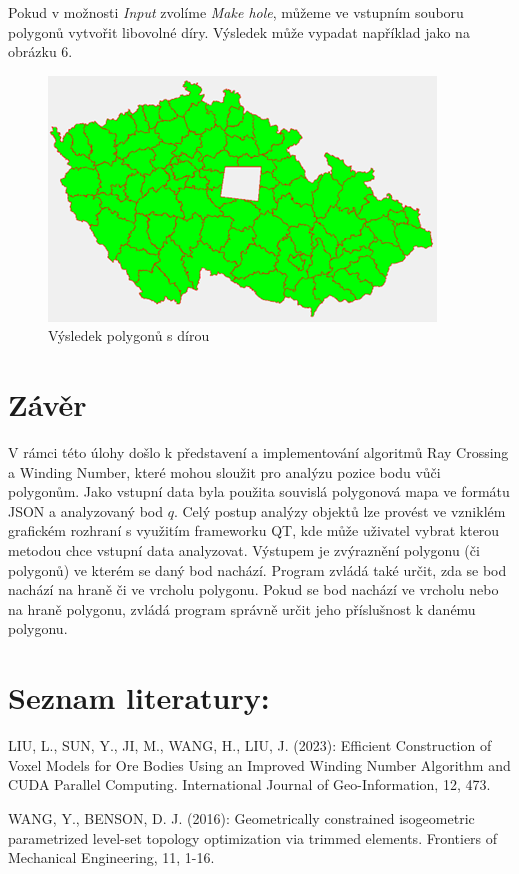 \documentclass{article}
\begin{document}
\begin{spacing}{1.5}
Pokud v možnosti \textit{Input} zvolíme \textit{Make hole}, můžeme ve vstupním souboru polygonů vytvořit libovolné díry. Výsledek může vypadat například jako na obrázku 6.

\begin{figure}[h]
    \centering
    \includegraphics[width=0.6\linewidth]{images/app04.png}
    \caption{Výsledek polygonů s dírou}
    \label{fig:enter-label}
\end{figure}

\section{Závěr}
V rámci této úlohy došlo k představení a implementování algoritmů Ray Crossing a Winding Number, které mohou sloužit pro analýzu pozice bodu vůči polygonům. Jako vstupní data byla použita souvislá polygonová mapa ve formátu JSON a analyzovaný bod $q$. Celý postup analýzy objektů lze provést ve vzniklém grafickém rozhraní s využitím frameworku QT, kde může uživatel vybrat kterou metodou chce vstupní data analyzovat. Výstupem je zvýraznění polygonu (či polygonů) ve kterém se daný bod nachází. Program zvládá také určit, zda se bod nachází na hraně či ve vrcholu polygonu. Pokud se bod nachází ve vrcholu nebo na hraně polygonu, zvládá program správně určit jeho příslušnost k danému polygonu.


\newpage
\section*{Seznam literatury: }
LIU, L., SUN, Y., JI, M., WANG, H., LIU, J. (2023): Efficient Construction of Voxel Models for Ore Bodies Using an Improved Winding Number Algorithm and CUDA Parallel Computing. International Journal of Geo-Information, 12, 473.

\vspace*{0.5cm}
\noindent WANG, Y., BENSON, D. J. (2016): Geometrically constrained isogeometric parametrized level-set topology optimization via trimmed elements. Frontiers of Mechanical Engineering, 11, 1-16. 

\end{spacing}
\end{document}
